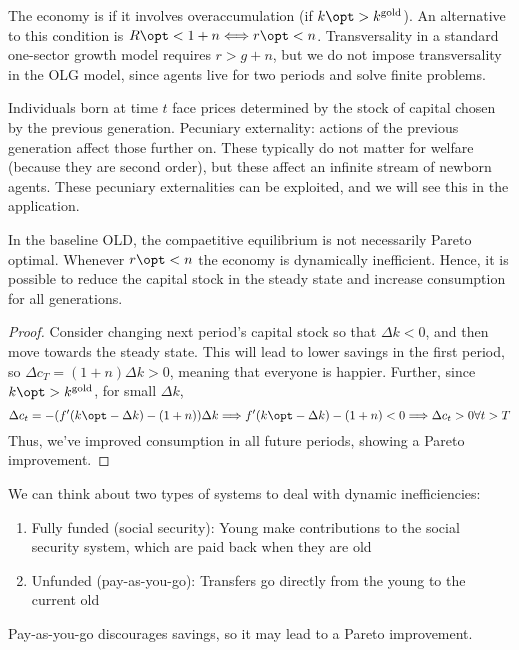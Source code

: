 \documentclass[10pt]{article}
\begin{document}
\begin{definition}
	The economy is  if it involves overaccumulation (\ie if $k\opt > k^{\text{gold}}$). An alternative to this condition is $R\opt < 1 + n \Longleftrightarrow r\opt < n$. Transversality in a standard one-sector growth model requires $r > g + n$, but we do not impose transversality in the OLG model, since agents live for two periods and solve finite problems. 
\end{definition}

\begin{remark}
	Individuals born at time $t$ face prices determined by the stock of capital chosen by the previous generation. Pecuniary externality: actions of the previous generation affect those further on. These typically do not matter for welfare (because they are second order), but these affect an infinite stream of newborn agents. These pecuniary externalities can be exploited, and we will see this in the application.
\end{remark}


\begin{proposition}
	In the baseline OLD, the compaetitive equilibrium is not necessarily Pareto optimal. Whenever $r\opt < n$ the economy is dynamically inefficient. Hence, it is possible to reduce the capital stock in the steady state and increase consumption for all generations.
\end{proposition}
\begin{proof}
	Consider changing next period's capital stock so that $\Delta k < 0$, and then move towards the steady state. This will lead to lower savings in the first period, so $\Delta c_T = (1+n)\Delta k >0$, meaning that everyone is happier. Further, since $k\opt > k^{\text{gold}}$, for small $\Delta k$, \[\Delta c_t = -(f'(k\opt - \Delta k) - (1+n))\Delta k \Longrightarrow f'(k\opt - \Delta k) - (1+n) < 0 \Longrightarrow \Delta c_t > 0 \forall t > T\]
	Thus, we've improved consumption in all future periods, showing a Pareto improvement.
\end{proof}

\begin{remark}
	We can think about two types of systems to deal with dynamic inefficiencies: 
	\begin{enumerate}
		\item Fully funded (social security): Young make contributions to the social security system, which are paid back when they are old
		\item Unfunded (pay-as-you-go): Transfers go directly from the young to the current old
	\end{enumerate}
	Pay-as-you-go discourages savings, so it may lead to a Pareto improvement.
\end{remark}
\end{document}
